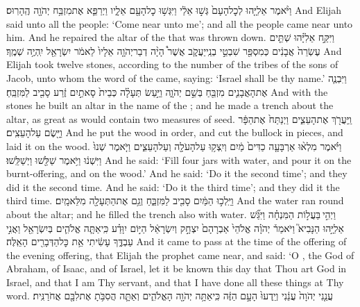 {וַיֹּ֨אמֶר אֵלִיָּ֤הוּ לְכׇל\maqqaf הָעָם֙ גְּשׁ֣וּ אֵלַ֔י וַיִּגְּשׁ֥וּ כׇל\maqqaf הָעָ֖ם אֵלָ֑יו וַיְרַפֵּ֛א אֶת\maqqaf מִזְבַּ֥ח יְהֹוָ֖ה הֶֽהָרֽוּס׃}
{And Elijah said unto all the people: ‘Come near unto me’; and all the people came near unto him. And he repaired the altar of the \lord\space that was thrown down.}
{וַיִּקַּ֣ח אֵלִיָּ֗הוּ שְׁתֵּ֤ים עֶשְׂרֵה֙ אֲבָנִ֔ים כְּמִסְפַּ֖ר שִׁבְטֵ֣י בְנֵֽי\maqqaf יַעֲקֹ֑ב אֲשֶׁר֩ הָיָ֨ה דְבַר\maqqaf יְהֹוָ֤ה אֵלָיו֙ לֵאמֹ֔ר יִשְׂרָאֵ֖ל יִֽהְיֶ֥ה שְׁמֶֽךָ׃}
{And Elijah took twelve stones, according to the number of the tribes of the sons of Jacob, unto whom the word of the \lord\space came, saying: ‘Israel shall be thy name.’}
{וַיִּבְנֶ֧ה אֶת\maqqaf הָאֲבָנִ֛ים מִזְבֵּ֖חַ בְּשֵׁ֣ם יְהֹוָ֑ה וַיַּ֣עַשׂ תְּעָלָ֗ה כְּבֵית֙ סָאתַ֣יִם זֶ֔רַע סָבִ֖יב לַמִּזְבֵּֽחַ׃}
{And with the stones he built an altar in the name of the \lord; and he made a trench about the altar, as great as would contain two measures of seed.}
{וַֽיַּעֲרֹ֖ךְ אֶת\maqqaf הָעֵצִ֑ים וַיְנַתַּח֙ אֶת\maqqaf הַפָּ֔ר וַיָּ֖שֶׂם עַל\maqqaf הָעֵצִֽים׃}
{And he put the wood in order, and cut the bullock in pieces, and laid it on the wood.}
{וַיֹּ֗אמֶר מִלְא֨וּ אַרְבָּעָ֤ה כַדִּים֙ מַ֔יִם וְיִֽצְק֥וּ עַל\maqqaf הָעֹלָ֖ה וְעַל\maqqaf הָעֵצִ֑ים וַיֹּ֤אמֶר שְׁנוּ֙ וַיִּשְׁנ֔וּ וַיֹּ֥אמֶר שַׁלֵּ֖שׁוּ וַיְשַׁלֵּֽשׁוּ׃}
{And he said: ‘Fill four jars with water, and pour it on the burnt-offering, and on the wood.’ And he said: ‘Do it the second time’; and they did it the second time. And he said: ‘Do it the third time’; and they did it the third time.}
{וַיֵּֽלְכ֣וּ הַמַּ֔יִם סָבִ֖יב לַמִּזְבֵּ֑חַ וְגַ֥ם אֶת\maqqaf הַתְּעָלָ֖ה מִלֵּא\maqqaf מָֽיִם׃}
{And the water ran round about the altar; and he filled the trench also with water.}
{וַיְהִ֣י \legarmeh  בַּעֲל֣וֹת הַמִּנְחָ֗ה וַיִּגַּ֞שׁ אֵלִיָּ֣הוּ הַנָּבִיא֮ וַיֹּאמַר֒ יְהֹוָ֗ה אֱלֹהֵי֙ אַבְרָהָם֙ יִצְחָ֣ק וְיִשְׂרָאֵ֔ל הַיּ֣וֹם יִוָּדַ֗ע כִּֽי\maqqaf אַתָּ֧ה אֱלֹהִ֛ים בְּיִשְׂרָאֵ֖ל וַאֲנִ֣י עַבְדֶּ֑ךָ  עָשִׂ֔יתִי אֵ֥ת כׇּל\maqqaf הַדְּבָרִ֖ים הָאֵֽלֶּה׃}
{And it came to pass at the time of the offering of the evening offering, that Elijah the prophet came near, and said: ‘O \lord, the God of Abraham, of Isaac, and of Israel, let it be known this day that Thou art God in Israel, and that I am Thy servant, and that I have done all these things at Thy word.}
{עֲנֵ֤נִי יְהֹוָה֙ עֲנֵ֔נִי וְיֵֽדְעוּ֙ הָעָ֣ם הַזֶּ֔ה כִּֽי\maqqaf אַתָּ֥ה יְהֹוָ֖ה הָאֱלֹהִ֑ים וְאַתָּ֛ה הֲסִבֹּ֥תָ אֶת\maqqaf לִבָּ֖ם אֲחֹרַנִּֽית׃}
